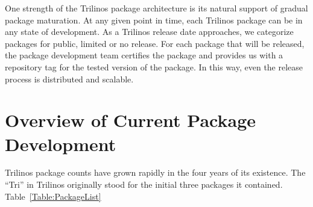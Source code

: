 \documentclass[12pt,relax]{TPA}
\begin{document}
One strength of the Trilinos package architecture is its natural
support of gradual package maturation.  At any given point in time,
each Trilinos package can be in any state of development.  As a
Trilinos release date approaches, we categorize packages for public,
limited or no release.  For each package that will be released, the
package development team certifies the package and provides us with a
repository tag for the tested version of the package.  In this way,
even the release process is distributed and scalable.

\section{Overview of Current Package Development}
\label{sect:Software}

Trilinos package counts have grown rapidly in the four years of its
existence.  The ``Tri'' in Trilinos originally stood for the initial
three packages it contained.  Table~\ref{Table:PackageList}
\end{document}
